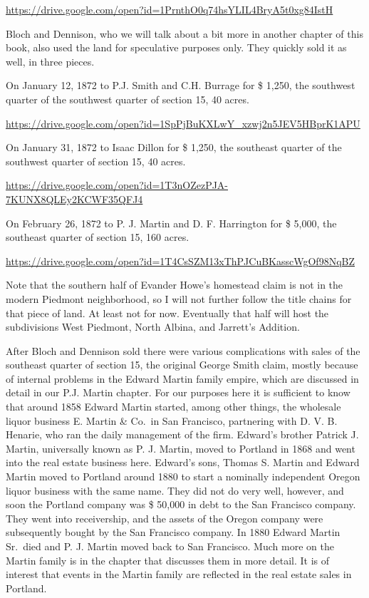 \documentclass[
  12pt,
]{book}
\begin{document}
\url{https://drive.google.com/open?id=1PrnthO0q74hsYLIL4BryA5t0xg84IstH}

Bloch and Dennison, who we will talk about a bit more in another chapter of this book, also used the land for speculative purposes only. They quickly sold it as well, in three pieces.

On January 12, 1872 to P.J. Smith and C.H. Burrage for \$ 1,250, the southwest quarter of the southwest quarter of section 15, 40 acres.

\url{https://drive.google.com/open?id=1SpPjBuKXLwY_xzwj2n5JEV5HBprK1APU}

On January 31, 1872 to Isaac Dillon for \$ 1,250, the southeast quarter of the southwest quarter of section 15, 40 acres.

\url{https://drive.google.com/open?id=1T3nOZezPJA-7KUNX8QLEy2KCWF35QFJ4}

On February 26, 1872 to P. J. Martin and D. F. Harrington for \$ 5,000, the southeast quarter of section 15, 160 acres.

\url{https://drive.google.com/open?id=1T4CsSZM13xThPJCuBKasscWgOf98NqBZ}

Note that the southern half of Evander Howe's homestead claim is not in the modern Piedmont neighborhood, so I will not further follow the title chains for that piece of land. At least not for now. Eventually that half will host the subdivisions West Piedmont, North Albina, and Jarrett's Addition.

After Bloch and Dennison sold there were various complications with sales of the southeast quarter of section 15, the original George Smith claim, mostly because of internal problems in the Edward Martin family empire, which are discussed in detail in our P.J. Martin chapter. For our purposes here it is sufficient to know that around 1858 Edward Martin started, among other things, the wholesale liquor business E. Martin \& Co.~in San Francisco, partnering with D. V. B. Henarie, who ran the daily management of the firm. Edward's brother Patrick J. Martin, universally known as P. J. Martin, moved to Portland in 1868 and went into the real estate business here. Edward's sons, Thomas S. Martin and Edward Martin moved to Portland around 1880 to start a nominally independent Oregon liquor business with the same name. They did not do very well, however, and soon the Portland company was \$ 50,000 in debt to the San Francisco company. They went into receivership, and the assets of the Oregon company were subsequently bought by the San Francisco company. In 1880 Edward Martin Sr.~died and P. J. Martin moved back to San Francisco. Much more on the Martin family is in the chapter that discusses them in more detail. It is of interest that events in the Martin family are reflected in the real estate sales in Portland.
\end{document}
